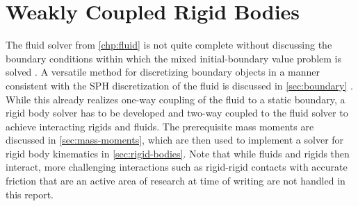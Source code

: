 \documentclass[oneside, a4paper]{book}
\newcommand\br[1]{\left(#1\right)}
\begin{document}
    
    



\chapter{Weakly Coupled Rigid Bodies}\label{chp:rigid}
    The fluid solver from \autoref{chp:fluid} is not quite complete without discussing the boundary conditions within which the mixed initial-boundary value problem is solved \autocite{tutorial2019}. A versatile method for discretizing boundary objects in a manner consistent with the SPH discretization of the fluid is discussed in \autoref{sec:boundary} \autocite{versatile-boundary-akinci}. While this already realizes one-way coupling of the fluid to a static boundary, a rigid body solver has to be developed and two-way coupled to the fluid solver to achieve interacting rigids and fluids. The prerequisite mass moments are discussed in \autoref{sec:mass-moments}, which are then used to implement a solver for rigid body kinematics in \autoref{sec:rigid-bodies}. Note that while fluids and rigids then interact, more challenging interactions such as rigid-rigid contacts with accurate friction that are an active area of research at time of writing \autocite{monolithic-rigids-timo} are not handled in this report.
\end{document}
